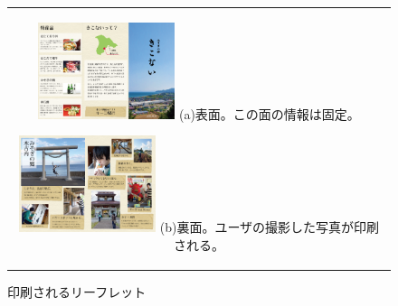 \begin{figure}[htbp]
  \begin{center}
    \begin{tabular}{c}

      \begin{minipage}{0.33\hsize}
        \begin{center}
\includegraphics[width=4cm, bb=0 0 842 595]{leaflet_front.png}
          \hspace{1cm} (a)表面。この面の情報は固定。
        \end{center}
      \end{minipage}

      \begin{minipage}{0.33\hsize}
        \begin{center}
\includegraphics[width=4cm, bb=0 0 842 595]{leaflet_back.png}
          \hspace{1cm} (b)裏面。ユーザの撮影した写真が印刷される。
        \end{center}
      \end{minipage}

    \end{tabular}
    \caption{印刷されるリーフレット}
    \label{fig:lena}
  \end{center}
\end{figure}
